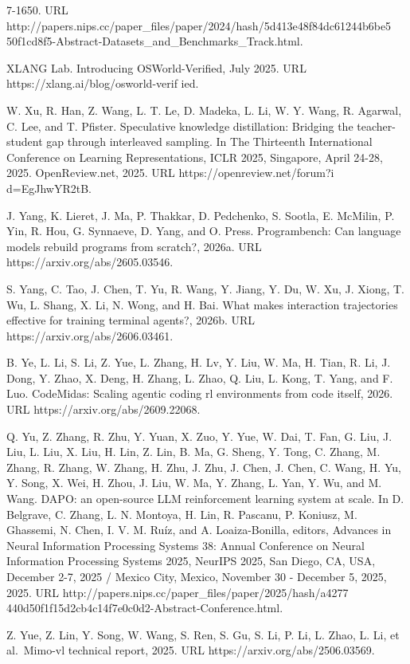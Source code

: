 7-1650. URL
http://papers.nips.cc/paper\_files/paper/2024/hash/5d413e48f84dc61244b6be5
50f1cd8f5-Abstract-Datasets\_and\_Benchmarks\_Track.html.

XLANG Lab. Introducing OSWorld-Verified, July 2025. URL
https://xlang.ai/blog/osworld-verif ied.

W. Xu, R. Han, Z. Wang, L. T. Le, D. Madeka, L. Li, W. Y. Wang, R.
Agarwal, C. Lee, and T. Pfister. Speculative knowledge distillation:
Bridging the teacher-student gap through interleaved sampling. In The
Thirteenth International Conference on Learning Representations, ICLR
2025, Singapore, April 24-28, 2025. OpenReview.net, 2025. URL
https://openreview.net/forum?i d=EgJhwYR2tB.

J. Yang, K. Lieret, J. Ma, P. Thakkar, D. Pedchenko, S. Sootla, E.
McMilin, P. Yin, R. Hou, G. Synnaeve, D. Yang, and O. Press.
Programbench: Can language models rebuild programs from scratch?, 2026a.
URL https://arxiv.org/abs/2605.03546.

S. Yang, C. Tao, J. Chen, T. Yu, R. Wang, Y. Jiang, Y. Du, W. Xu, J.
Xiong, T. Wu, L. Shang, X. Li, N. Wong, and H. Bai. What makes
interaction trajectories effective for training terminal agents?, 2026b.
URL https://arxiv.org/abs/2606.03461.

B. Ye, L. Li, S. Li, Z. Yue, L. Zhang, H. Lv, Y. Liu, W. Ma, H. Tian, R.
Li, J. Dong, Y. Zhao, X. Deng, H. Zhang, L. Zhao, Q. Liu, L. Kong, T.
Yang, and F. Luo. CodeMidas: Scaling agentic coding rl environments from
code itself, 2026. URL https://arxiv.org/abs/2609.22068.

Q. Yu, Z. Zhang, R. Zhu, Y. Yuan, X. Zuo, Y. Yue, W. Dai, T. Fan, G.
Liu, J. Liu, L. Liu, X. Liu, H. Lin, Z. Lin, B. Ma, G. Sheng, Y. Tong,
C. Zhang, M. Zhang, R. Zhang, W. Zhang, H. Zhu, J. Zhu, J. Chen, J.
Chen, C. Wang, H. Yu, Y. Song, X. Wei, H. Zhou, J. Liu, W. Ma, Y. Zhang,
L. Yan, Y. Wu, and M. Wang. DAPO: an open-source LLM reinforcement
learning system at scale. In D. Belgrave, C. Zhang, L. N. Montoya, H.
Lin, R. Pascanu, P. Koniusz, M. Ghassemi, N. Chen, I. V. M. Ruíz, and A.
Loaiza-Bonilla, editors, Advances in Neural Information Processing
Systems 38: Annual Conference on Neural Information Processing Systems
2025, NeurIPS 2025, San Diego, CA, USA, December 2-7, 2025 / Mexico
City, Mexico, November 30 - December 5, 2025, 2025. URL
http://papers.nips.cc/paper\_files/paper/2025/hash/a4277
440d50f1f15d2cb4c14f7e0c0d2-Abstract-Conference.html.

Z. Yue, Z. Lin, Y. Song, W. Wang, S. Ren, S. Gu, S. Li, P. Li, L. Zhao,
L. Li, et al.~Mimo-vl technical report, 2025. URL
https://arxiv.org/abs/2506.03569.

